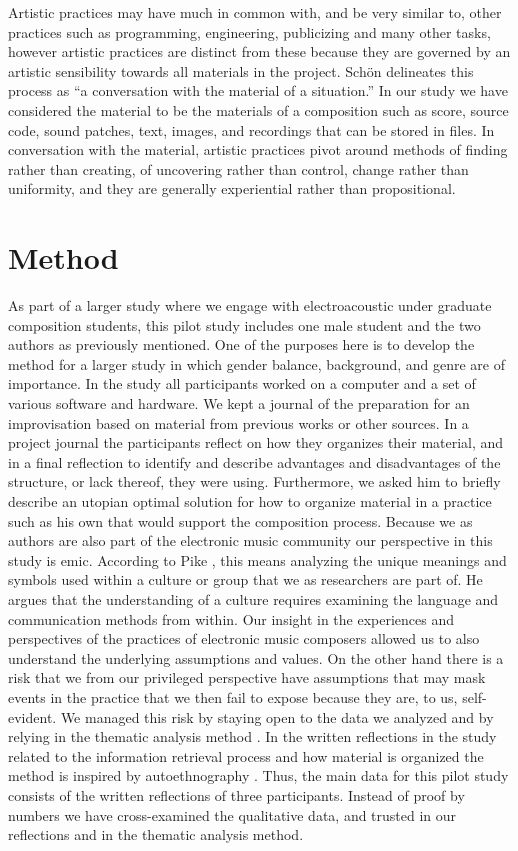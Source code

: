 \documentclass[runningheads,a4paper]{cmmr2023}
\begin{document}
Artistic practices may have much in common with, and be very similar to, other practices such as programming, engineering, publicizing and many other tasks, however artistic practices are distinct from these because they are governed by an artistic sensibility towards all materials in the project. 
Schön \cite{schon1983reflective} delineates this process as “a conversation with the material of a situation.” In our study we have considered the material to be the materials of a composition such as score, source code, sound patches, text, images, and recordings that can be stored in files. In conversation with the material, artistic practices pivot around methods of finding rather than creating, of uncovering rather than control, change rather than uniformity, and they are generally experiential rather than propositional.

\section{Method}
As part of a larger study where we engage with electroacoustic under graduate composition students, this pilot study includes one male student and the two authors as previously mentioned. 
One of the purposes here is to develop the method for a larger study in which gender balance, background, and genre are of importance. 
In the study all participants worked on a computer and a set of various software and hardware.
We kept a journal of the preparation for an improvisation based on material from previous works or other sources.
In a project journal the participants reflect on how they organizes their material, and in a final reflection to identify and describe advantages and disadvantages of the structure, or lack thereof, they  were using. Furthermore, we asked him to briefly describe an utopian optimal solution for how to organize material in a practice such as his own that would support the composition process. Because we as authors are also part of the electronic music community our perspective in this study is emic. According to Pike \cite{pike1967language}, this means analyzing the unique meanings and symbols used within a culture or group that we as researchers are part of. He argues that the understanding of a culture requires examining the language and communication methods from within. Our insight in the experiences and perspectives of the practices of electronic music composers allowed us to also understand the underlying assumptions and values. On the other hand there is a risk that we from our privileged perspective have assumptions that may mask events in the practice that we then fail to expose because they are, to us, self-evident. We managed this risk by staying open to the data we analyzed and by relying in the thematic analysis method \cite{maguire2017,braun2006}. In the written reflections in the study related to the information retrieval process and how material is organized the method is inspired by autoethnography \cite{ellis2004ethnographic}. Thus, the main data for this pilot study consists of the written reflections of three participants. Instead of proof by numbers we have cross-examined the qualitative data, and trusted in our reflections and in the thematic analysis method.
\end{document}
